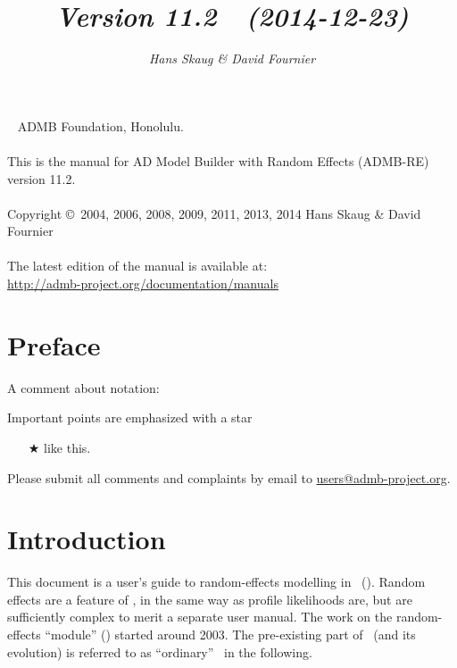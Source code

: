 \documentclass{admbmanual}
\newcommand\admbversion{11.2}
\begin{document}
\title{%
  \vspace{4.5ex}\textsf{\textit{Version \admbversion~~(2014-12-23)\\[3pt]
    }}\vspace{3ex}
}
\author{\textsf{\textit{Hans Skaug \& David Fournier}}}

\maketitle

~\vfill
\noindent ADMB Foundation, Honolulu.\\\\
\noindent This is the manual for AD Model Builder with Random Effects (ADMB-RE)
version \admbversion.\\\\
\noindent Copyright \copyright\ 2004, 2006, 2008, 2009, 2011, 2013, 2014 Hans
Skaug \& David Fournier\\\\
\noindent The latest edition of the manual is available at:\\
\url{http://admb-project.org/documentation/manuals}

\tableofcontents

\chapter*{Preface}

A comment about notation:

Important points are emphasized with a star
\begin{itemize}
  \item[$\bigstar$] like this.
\end{itemize}

Please submit all comments and complaints by email to
\href{mailto:users@admb-project.org}{users@admb-project.org}.

\chapter{Introduction}

This document is a user's guide to random-effects modelling in \ADM\ (\scAB).
Random effects are a feature of \scAB, in the same way as profile likelihoods
are, but are sufficiently complex to merit a separate user manual. The work on
the random-effects ``module'' (\scAR) started around 2003. The pre-existing part
of \scAB\ (and its evolution) is referred to as ``ordinary'' \scAB\ in the
following.
\end{document}
